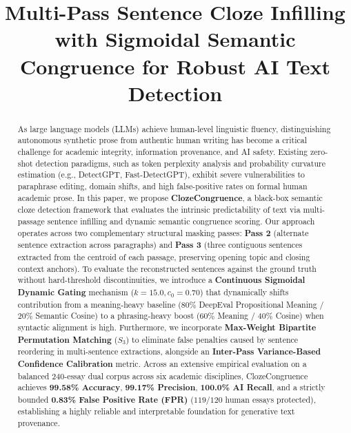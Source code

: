 \documentclass[conference]{IEEEtran}
\begin{document}
\title{Multi-Pass Sentence Cloze Infilling with Sigmoidal Semantic Congruence for Robust AI Text Detection}

\author{
}

\maketitle

\begin{abstract}
As large language models (LLMs) achieve human-level linguistic fluency, distinguishing autonomous synthetic prose from authentic human writing has become a critical challenge for academic integrity, information provenance, and AI safety. Existing zero-shot detection paradigms, such as token perplexity analysis and probability curvature estimation (e.g., DetectGPT, Fast-DetectGPT), exhibit severe vulnerabilities to paraphrase editing, domain shifts, and high false-positive rates on formal human academic prose. In this paper, we propose \textbf{ClozeCongruence}, a black-box semantic cloze detection framework that evaluates the intrinsic predictability of text via multi-passage sentence infilling and dynamic semantic congruence scoring. Our approach operates across two complementary structural masking passes: \textbf{Pass 2} (alternate sentence extraction across paragraphs) and \textbf{Pass 3} (three contiguous sentences extracted from the centroid of each passage, preserving opening topic and closing context anchors). To evaluate the reconstructed sentences against the ground truth without hard-threshold discontinuities, we introduce a \textbf{Continuous Sigmoidal Dynamic Gating} mechanism ($k=15.0, c_0=0.70$) that dynamically shifts contribution from a meaning-heavy baseline ($80\%$ DeepEval Propositional Meaning / $20\%$ Semantic Cosine) to a phrasing-heavy boost ($60\%$ Meaning / $40\%$ Cosine) when syntactic alignment is high. Furthermore, we incorporate \textbf{Max-Weight Bipartite Permutation Matching} ($S_3$) to eliminate false penalties caused by sentence reordering in multi-sentence extractions, alongside an \textbf{Inter-Pass Variance-Based Confidence Calibration} metric. Across an extensive empirical evaluation on a balanced 240-essay dual corpus across six academic disciplines, ClozeCongruence achieves \textbf{99.58\% Accuracy}, \textbf{99.17\% Precision}, \textbf{100.0\% AI Recall}, and a strictly bounded \textbf{0.83\% False Positive Rate (FPR)} ($119/120$ human essays protected), establishing a highly reliable and interpretable foundation for generative text provenance.
\end{abstract}
\end{document}
